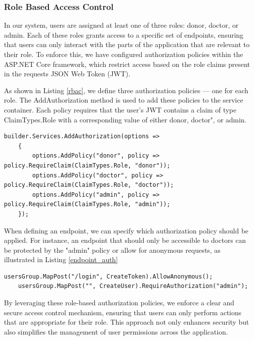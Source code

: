 \subsubsection{Role Based Access Control}
In our system, users are assigned at least one of three roles: donor, doctor, or admin. Each of these roles grants access to a specific set of endpoints, ensuring that users can only interact with the parts of the application that are relevant to their role. To enforce this, we have configured authorization policies within the ASP.NET Core framework, which restrict access based on the role claims present in the requests JSON Web Token (JWT).

As shown in Listing \ref{rbac}, we define three authorization policies — one for each role. The AddAuthorization method is used to add these policies to the service container. Each policy requires that the user’s JWT contains a claim of type ClaimTypes.Role with a corresponding value of either donor, doctor", or admin.

\begin{lstlisting}[style=sharpc, caption={Configuring Role-Based Authorization Policies in ASP.NET Core: Defining Access Control for Donor, Doctor, and Admin Roles.}, label={rbac}] 
	builder.Services.AddAuthorization(options =>
	{
		options.AddPolicy("donor", policy => policy.RequireClaim(ClaimTypes.Role, "donor"));
		options.AddPolicy("doctor", policy => policy.RequireClaim(ClaimTypes.Role, "doctor"));
		options.AddPolicy("admin", policy => policy.RequireClaim(ClaimTypes.Role, "admin"));
	});
\end{lstlisting}

When defining an endpoint, we can specify which authorization policy should be applied. For instance, an endpoint that should only be accessible to doctors can be protected by the "admin" policy or allow for anonymous requests, as illustrated in Listing \ref{endpoint_auth}

\begin{lstlisting}[style=sharpc, caption={Examples of endoint policies}, label={endpoint_auth}] 
	usersGroup.MapPost("/login", CreateToken).AllowAnonymous();
	usersGroup.MapPost("", CreateUser).RequireAuthorization("admin");
\end{lstlisting}

By leveraging these role-based authorization policies, we enforce a clear and secure access control mechanism, ensuring that users can only perform actions that are appropriate for their role. This approach not only enhances security but also simplifies the management of user permissions across the application.

